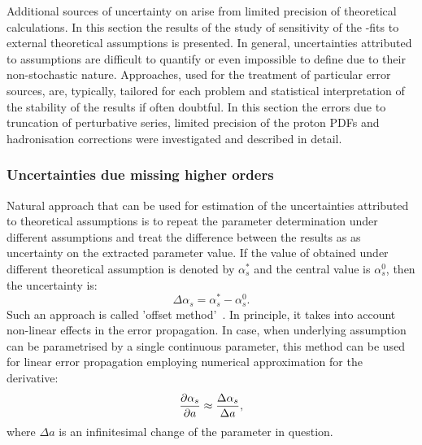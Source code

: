 Additional sources of uncertainty on \as arise from limited precision of theoretical calculations. In this section the results of the study of sensitivity of the \asz-fits to external theoretical assumptions is presented. In general, uncertainties attributed to assumptions are difficult to quantify or even impossible to define due to their non-stochastic nature. Approaches, used for the treatment of particular error sources, are, typically, tailored for each problem and statistical interpretation of the stability of the results if often doubtful. In this section the errors due to truncation of perturbative series, limited precision of the proton PDFs and hadronisation corrections were investigated and described in detail.

\subsubsection{Uncertainties due missing higher orders}
\label{subsec:asscalevar}
Natural approach that can be used for estimation of the uncertainties attributed to theoretical assumptions is to repeat the parameter determination under different assumptions and treat the difference between the results as as uncertainty on the extracted parameter value. If the value of \asz obtained under different theoretical assumption is denoted by $\alpha_s^{\ast}$ and the central value is $\alpha_s^0$, then the uncertainty is:
\begin{equation}
 \Delta\alpha_s = \alpha_s^{\ast} - \alpha_s^0.
\end{equation}
Such an approach is called 'offset method'~\cite{amanda}. In principle, it takes into account non-linear effects in the error propagation. In case, when underlying assumption can be parametrised by a single continuous parameter, this method can be used for linear error propagation employing numerical approximation for the derivative:
\begin{equation}
 \frac{\partial \mbox{$\alpha_{s}$}}{ \partial a} \approx \frac{\Delta\alpha_s}{\Delta a},
\end{equation}
where $\Delta a$ is an infinitesimal change of the parameter in question.

